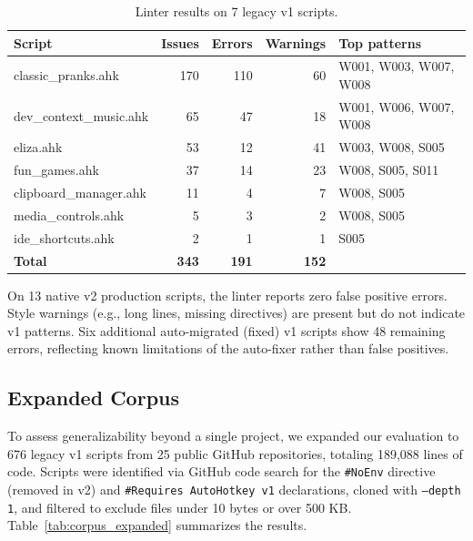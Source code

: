 \documentclass[11pt,a4paper]{article}
\begin{document}
\begin{enumerate}
\begin{table}[h]
\centering\small
\caption{Linter results on 7 legacy v1 scripts.}
\label{tab:v1}
\begin{tabular}{lrrrl}
\toprule
\textbf{Script} & \textbf{Issues} & \textbf{Errors} & \textbf{Warnings} & \textbf{Top patterns} \\
\midrule
classic\_pranks.ahk & 170 & 110 & 60 & W001, W003, W007, W008 \\
dev\_context\_music.ahk & 65 & 47 & 18 & W001, W006, W007, W008 \\
eliza.ahk & 53 & 12 & 41 & W003, W008, S005 \\
fun\_games.ahk & 37 & 14 & 23 & W008, S005, S011 \\
clipboard\_manager.ahk & 11 & 4 & 7 & W008, S005 \\
media\_controls.ahk & 5 & 3 & 2 & W008, S005 \\
ide\_shortcuts.ahk & 2 & 1 & 1 & S005 \\
\midrule
\textbf{Total} & \textbf{343} & \textbf{191} & \textbf{152} & \\
\bottomrule
\end{tabular}
\end{table}

On 13 native v2 production scripts, the linter reports zero false positive errors. Style warnings (e.g., long lines, missing directives) are present but do not indicate v1 patterns. Six additional auto-migrated (fixed) v1 scripts show 48 remaining errors, reflecting known limitations of the auto-fixer rather than false positives.

\subsection{Expanded Corpus}

To assess generalizability beyond a single project, we expanded our evaluation to 676 legacy v1 scripts from 25 public GitHub repositories, totaling 189,088 lines of code. Scripts were identified via GitHub code search for the \texttt{\#NoEnv} directive (removed in v2) and \texttt{\#Requires AutoHotkey v1} declarations, cloned with \texttt{--depth 1}, and filtered to exclude files under 10 bytes or over 500 KB. Table~\ref{tab:corpus_expanded} summarizes the results.


\end{enumerate}
\end{document}
